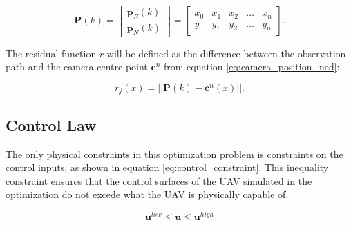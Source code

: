 \begin{equation}
	\mathbf{P}(k) = 
	\begin{bmatrix}
		\mathbf{p}_E(k) \\ \mathbf{p}_N(k)
	\end{bmatrix}
	=
	\begin{bmatrix}
		x_0 & x_1 & x_2 & \hdots & x_n \\
		y_0 & y_1 & y_2 & \hdots & y_n
	\end{bmatrix}.
\end{equation}

The residual function $r$ will be defined as the difference between the observation path and the camera centre point $\mathbf{c}^n$ from equation \ref{eq:camera_position_ned}:

\begin{equation}
	r_j(x) = ||\mathbf{P}(k) - \mathbf{c}^n(x)||.
\end{equation} 


\subsection{Control Law}

The only physical constraints in this optimization problem is constraints on the control inputs, as shown in equation \ref{eq:control_constraint}. This inequality constraint ensures that the control surfaces of the UAV simulated in the optimization do not excede what the UAV is physically capable of.

\begin{equation}
	\label{eq:control_constraint}
	\mathbf{u}^{low} \leq \mathbf{u} \leq \mathbf{u}^{high}
\end{equation}
